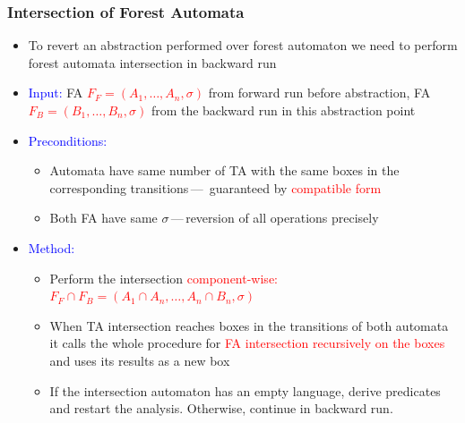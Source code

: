 \documentclass{beamer}
\newcommand{\hlbl}[1]{\textcolor{blue}{#1}}
\newcommand{\hlrd}[1]{\textcolor{red}{#1}}
\begin{document}

\begin{frame}
\frametitle{Intersection of Forest Automata}
	\begin{itemize}
		\item To revert an abstraction performed over forest automaton we need
			to perform forest automata intersection in backward run
		\item \hlbl{Input:} FA \hlrd{$F_F=(A_1, \ldots, A_n, \sigma)$} from
			forward run before abstraction, FA \hlrd{$F_B=(B_1,\ldots, B_n, \sigma)$}
			from the backward run in this abstraction point
		\item \hlbl{Preconditions:}
			\begin{itemize}
				\item Automata have same number of TA with the same boxes in the corresponding transitions\,---\,
				guaranteed by \hlrd{compatible form}
				\item Both FA have same $\sigma$\,---\,reversion of all operations precisely
			\end{itemize}

		\item \hlbl{Method:}
			\begin{itemize}
				\item Perform the intersection \hlrd{component-wise: $F_F \cap F_B = (A_1 \cap A_n,\ldots,A_n\cap B_n, \sigma)$}
				\item When TA intersection reaches boxes in the transitions of both automata it calls the whole
					procedure for \hlrd{FA intersection recursively on the boxes} and uses its results as a new box
				\item If the intersection automaton has an empty language, derive predicates and restart the analysis.
					Otherwise, continue in backward run. 
			\end{itemize}
	\end{itemize}
\end{frame}

\end{document}
